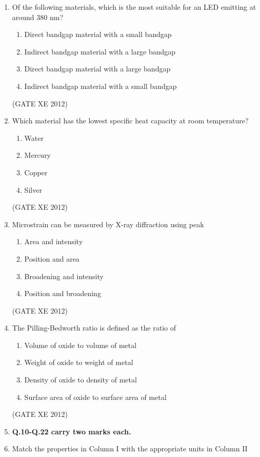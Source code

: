 \documentclass[12pt]{article}
\begin{document}
\begin{enumerate}
\item Of the following materials, which is the most suitable for an LED emitting at around 380 nm?
\begin{enumerate}
\item Direct bandgap material with a small bandgap
\item Indirect bandgap material with a large bandgap
\item Direct bandgap material with a large bandgap
\item Indirect bandgap material with a small bandgap
\end{enumerate}
(GATE XE 2012)

\item Which material has the lowest specific heat capacity at room temperature?
\begin{multicols}{4}
\begin{enumerate}
\item Water
\item Mercury
\item Copper
\item Silver
\end{enumerate}
\end{multicols}
(GATE XE 2012)

\item Microstrain can be measured by X-ray diffraction using peak
\begin{enumerate}
\item Area and intensity
\item Position and area
\item Broadening and intensity
\item Position and broadening
\end{enumerate}
(GATE XE 2012)


\item The Pilling-Bedworth ratio is defined as the ratio of
\begin{enumerate}
\item Volume of oxide to volume of metal
\item Weight of oxide to weight of metal
\item Density of oxide to density of metal
\item Surface area of oxide to surface area of metal
\end{enumerate}
(GATE XE 2012)

\item[]  \textbf{Q.10-Q.22 carry two marks each.}

\item Match the properties in Column I with the appropriate units in Column II


\end{enumerate}
\end{document}
